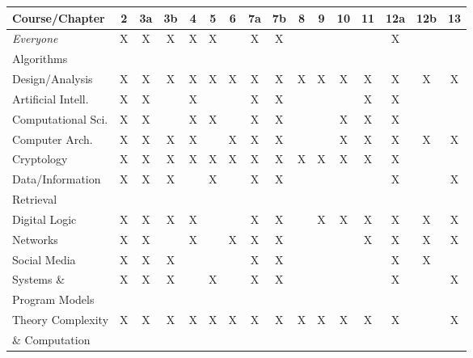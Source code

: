 \documentclass{article}
\begin{document}
\bigskip

{\scriptsize

\noindent
\begin{tabular}{|l||c|c|c|c|c|c|c|c|c|c|c|c|c|c|c|}
\hline
{\bf Course}/{\bf Chapter}
   & 2 & 3a & 3b & 4 & 5 & 6 & 7a & 7b & 8 & 9 & 10 & 11 & 12a & 12b & 13 \\
\hline
\hline
{\em Everyone} 
   & X & X & X & X & X &  & X & X &  &  &  &  & X & &  \\
\hline
Algorithms  &  &  &  &  &  &  &  &  &  &  & &  &  & & \\
\hspace*{.1in}Design/Analysis
   & X & X & X & X & X & X & X & X & X & X & X & X & X & X & X \\
   \hline
Artificial Intell.
   & X & X & & X &  &  & X & X &  &  &  & X & X & &  \\
   \hline
Computational Sci.
   & X & X & & X & X &  & X & X &  &  & X & X & X &  &  \\
\hline
Computer Arch. 
   & X & X & X & X &  & X & X & X &  &  & X & X & X & X & X \\
\hline
Cryptology 
   & X & X & X & X & X & X & X & X & X & X & X & X & X & &  \\
\hline
Data/Information 
   & X & X & X & & X &  & X & X &  &  &  &  & X & & X \\
\hspace*{.1in}Retrieval
    &  &  &  &  &  &  &  &  &  &  & &  &  & & \\
\hline
Digital Logic 
   & X & X & X & X &  &  & X & X &  & X & X & X & X & X & X \\
\hline
Networks
   & X & X & & X &  & X & X & X &  &  &  & X & X & X & X \\
\hline
Social Media 
   & X & X & X &  &  &  & X & X &  &  &  &  & X & X &  \\
\hline
Systems \&     
  & X & X & X &  & X &  & X & X &  &  &  &  & X & & X \\
\hspace*{.1in}Program Models &  & &  &  &  &  & &  &  &  &  &  &  & & \\ 
\hline
Theory Complexity 
   & X & X & X & X & X & X & X & X & X & X & X & X & X & & X \\
\hspace*{.1in}\& Computation    &  &  & &  &  &  & &  &  &  &  &  &  & & \\
\hline
\end{tabular}
}


\bigskip
\end{document}
